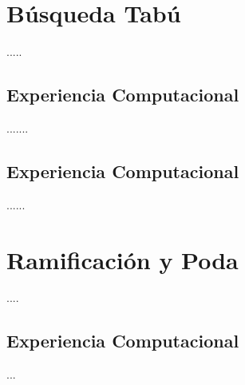 \documentclass{article}
\begin{document}
\section{Búsqueda Tabú}

.....

\subsection{Experiencia Computacional}

.......

\subsection{Experiencia Computacional}

......
\section{Ramificación y Poda}

....

\subsection{Experiencia Computacional}

...
\end{document}
